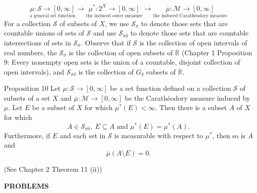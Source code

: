 \[
	\underset{\text{a general set function}}{\mu:\mathcal{S}\to[0,\infty]}\longrightarrow
	\underset{\text{the induced outer measure}}{\mu^*:2^X\to[0,\infty]}\longrightarrow
	\underset{\text{the induced Carath\'eodory measure}}{\overline{\mu}:\mathcal{M}\to[0,\infty]}
\]
For a collection $\mathcal{S}$ of subsets of $X$, we use $\mathcal{S}_\sigma$ to denote those sets that are countable unions of sets of $\mathcal{S}$ and use $\mathcal{S}_{\sigma\delta}$ to denote those sets that are countable intersections of sets in $\mathcal{S}_\sigma$.
Observe that if $\mathcal{S}$ is the collection of open intervals of real numbers, the $\mathcal{S}_\sigma$ is the collection of open subsets of $\mathbb{R}$ (Chapter 1 Proposition 9: Every nonempty open sets is the union of a countable, disjoint collection of open intervals), and $\mathcal{S}_{\sigma\delta}$ is the collection of $G_\delta$ subsets of $\mathbb{R}$.
\begin{namedthm*}{Proposition 10}
	Let $\mu:\mathcal{S}\to[0,\infty]$ be a set function defined on a collection $\mathcal{S}$ of subsets of a set $X$ and $\overline{\mu}:\mathcal{M}\to[0,\infty]$ be the Carath\'eodory measure induced by $\mu$.
	Let $E$ be a subset of $X$ for which $\mu^*(E)<\infty$.
	Then there is a subset $A$ of $X$ for which 
	\[
		A\in\mathcal{S}_{\sigma\delta},\ E\subseteq A\text{ and }\mu^*(E)=\mu^*(A).
	\]
	Furthermore, if $E$ and each set in $\mathcal{S}$ is measurable with respect to $\mu^*$, then so is $A$ and 
	\[
		\overline{\mu}(A\setminus E)=0.
	\]
\end{namedthm*}
(See Chapter 2 Theorem 11 (ii))
\begin{center}
	\textbf{PROBLEMS}
\end{center}
